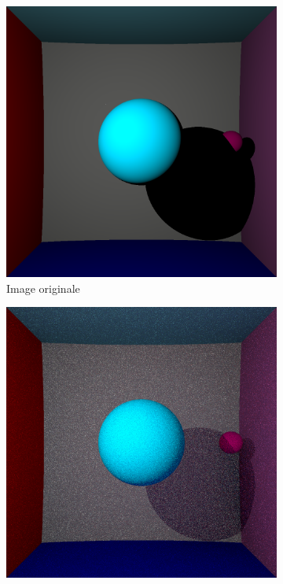 \documentclass[12pt,a4paper,twoside]{report}
\begin{document}
\begin{figure}[H]
	\centering
	\begin{subfigure}{.45\textwidth}
		\centering
		\includegraphics[width=1.\linewidth]{be3_02_1}
		\caption{Image originale}
		\label{fig:be3_02_1}
	\end{subfigure}
	\begin{subfigure}{.45\textwidth}
		\centering
		\includegraphics[width=1.\linewidth]{be3_02_10}

\end{subfigure}
\end{figure}
\end{document}
